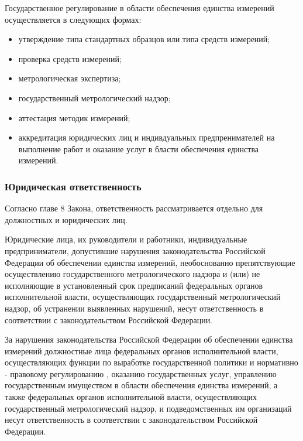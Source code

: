 \documentclass[14pt, a4paper] {ncc}
\begin{document}
	Государственное регулирование в области обеспечения единства
    измерений осуществляется в следующих формах:
	\begin{itemize}
		\item утверждение типа стандартных образцов или типа средств измерений;
		\item проверка средств измерений;
		\item метрологическая экспертиза;
		\item государственный метрологический надзор;
		\item аттестация методик измерений;
		\item аккредитация юридических лиц и индивдуальных предпренимателей
			  на выполнение работ и оказание услуг в бласти обеспечения единства измерений. \cite{federal}
	\end{itemize}


	\subsubsection{Юридическая ответственность}

		Согласно главе 8 Закона, ответственность рассматривается отдельно
		для должностных и юридических лиц.

        Юридические лица, их руководители и работники, индивидуальные предприниматели,
        допустившие нарушения законодательства Российской Федерации об
        обеспечении единства измерений, необоснованно препятствующие
        осуществлению государственного метрологического надзора и
        (или) не исполняющие в установленный срок предписаний федеральных органов
        исполнительной власти, осуществляющих государственный метрологический
        надзор, об устранении выявленных нарушений, несут ответственность в
        соответствии с законодательством Российской Федерации. 
	 
        За нарушения законодательства Российской Федерации об обеспечении
        единства измерений должностные лица федеральных органов исполнительной
        власти, осуществляющих функции по выработке государственной политики
        и нормативно - правовому регулированию , оказанию государственных
        услуг, управлению государственным имуществом в области обеспечения
        единства измерений, а также федеральных органов исполнительной
        власти, осуществляющих государственный метрологический надзор, и
        подведомственных им организаций несут ответственность в соответствии
        с законодательством Российской Федерации. \cite{federal}
\end{document}
